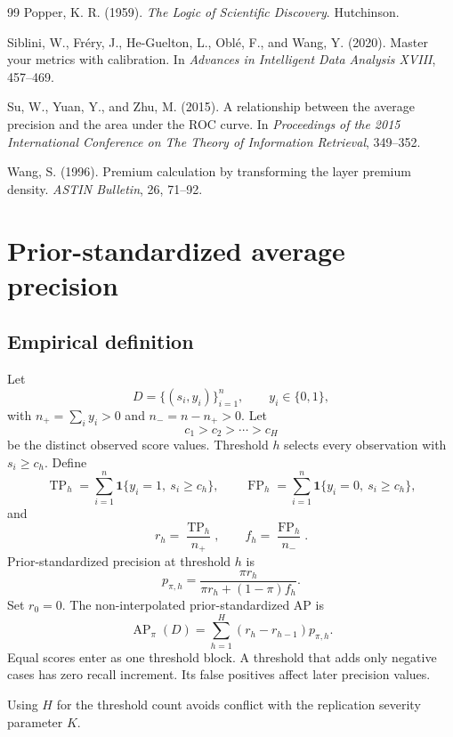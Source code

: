 \documentclass[11pt]{article}
\newcommand{\AP}{\operatorname{AP}}
\theoremstyle{remark}
\begin{document}
\begin{thebibliography}{99}
Popper, K. R. (1959).
\emph{The Logic of Scientific Discovery}.
Hutchinson.

Siblini, W., Fr\'ery, J., He-Guelton, L., Obl\'e, F., and Wang, Y. (2020).
Master your metrics with calibration.
In \emph{Advances in Intelligent Data Analysis XVIII}, 457--469.

Su, W., Yuan, Y., and Zhu, M. (2015).
A relationship between the average precision and the area under the ROC curve.
In \emph{Proceedings of the 2015 International Conference on The Theory of Information Retrieval}, 349--352.

Wang, S. (1996).
Premium calculation by transforming the layer premium density.
\emph{ASTIN Bulletin}, 26, 71--92.

\end{thebibliography}

\appendix

\section{Prior-standardized average precision}
\label{app:ap-definition}

\subsection{Empirical definition}

Let
\[
D=\{(s_i,y_i)\}_{i=1}^{n},
\qquad
y_i\in\{0,1\},
\]
with $n_+=\sum_i y_i>0$ and $n_-=n-n_+>0$. Let
\[
c_1>c_2>\cdots>c_H
\]
be the distinct observed score values. Threshold $h$ selects every observation with $s_i\geq c_h$. Define
\[
\operatorname{TP}_h
=
\sum_{i=1}^{n}
\mathbf{1}\{y_i=1,\ s_i\geq c_h\},
\qquad
\operatorname{FP}_h
=
\sum_{i=1}^{n}
\mathbf{1}\{y_i=0,\ s_i\geq c_h\},
\]
and
\[
r_h=\frac{\operatorname{TP}_h}{n_+},
\qquad
f_h=\frac{\operatorname{FP}_h}{n_-}.
\]
Prior-standardized precision at threshold $h$ is
\[
p_{\pi,h}
=
\frac{\pi r_h}
{\pi r_h+(1-\pi)f_h}.
\]
Set $r_0=0$. The non-interpolated prior-standardized AP is
\begin{equation}
\AP_\pi(D)
=
\sum_{h=1}^{H}
(r_h-r_{h-1})p_{\pi,h}.
\label{eq:empirical-ap}
\end{equation}
Equal scores enter as one threshold block. A threshold that adds only negative cases has zero recall increment. Its false positives affect later precision values.

Using $H$ for the threshold count avoids conflict with the replication severity parameter $K$.
\end{document}
